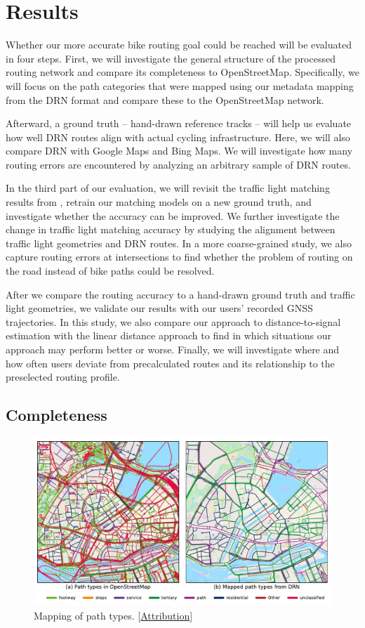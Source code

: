 \section{Results}

Whether our more accurate bike routing goal could be reached will be evaluated in four steps. First, we will investigate the general structure of the processed routing network and compare its completeness to OpenStreetMap. Specifically, we will focus on the path categories that were mapped using our metadata mapping from the DRN format and compare these to the OpenStreetMap network. 

Afterward, a ground truth -- hand-drawn reference tracks -- will help us evaluate how well DRN routes align with actual cycling infrastructure. Here, we will also compare DRN with Google Maps and Bing Maps. We will investigate how many routing errors are encountered by analyzing an arbitrary sample of DRN routes.

In the third part of our evaluation, we will revisit the traffic light matching results from , retrain our matching models on a new ground truth, and investigate whether the accuracy can be improved. We further investigate the change in traffic light matching accuracy by studying the alignment between traffic light geometries and DRN routes. In a more coarse-grained study, we also capture routing errors at intersections to find whether the problem of routing on the road instead of bike paths could be resolved. 

After we compare the routing accuracy to a hand-drawn ground truth and traffic light geometries, we validate our results with our users' recorded GNSS trajectories. In this study, we also compare our approach to distance-to-signal estimation with the linear distance approach to find in which situations our approach may perform better or worse. Finally, we will investigate where and how often users deviate from precalculated routes and its relationship to the preselected routing profile.

\subsection{Completeness}

\begin{figure}[t]
\centering
\includegraphics[width=\linewidth]{images/routing-drn-osm-map.pdf}
\caption{Mapping of path types. [\hyperref[attribution]{Attribution}]}
\label{fig:routing-drn-osm-map}
\end{figure}


